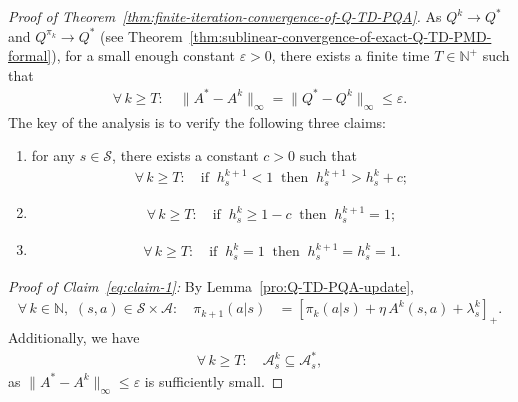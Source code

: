 \documentclass[10pt]{article}
\newcommand{\calA}{\mathcal{A}}
\newcommand{\calS}{\mathcal{S}}
\newcommand{\ls}{\left}
\newcommand{\rs}{\right}
\theoremstyle{plain}
\theoremstyle{definition}
\begin{document}
    \begin{proof}[Proof of Theorem~\ref{thm:finite-iteration-convergence-of-Q-TD-PQA}]
    As $Q^k \to Q^*$ and $Q^{\pi_k} \to Q^*$ (see Theorem~\ref{thm:sublinear-convergence-of-exact-Q-TD-PMD-formal}), for a small enough constant $\varepsilon > 0$, there exists a finite time $T \in \mathbb{N}^+$ such that 
    \begin{align*}
        \forall\, k \geq T: \quad \| A^* - A^k \|_\infty = \| Q^* - Q^k \|_\infty \leq \varepsilon.
    \end{align*}
    The key of the analysis is to verify the following three claims:
    \begin{enumerate}[label=(\Roman*)]
        \item \label{eq:claim-1} for any $s\in\calS$, there exists a constant $c > 0$ such that
        \begin{align}
            \forall\, k\geq T: \quad \mbox{if} \;\; h_s^{k+1} < 1 \;\; \mbox{then} \;\; h_s^{k+1} > h_s^k + c;
            \label{eq:property-1}
        \end{align}
        \item \label{eq:claim-2} 
        \begin{align}
            \forall\, k \geq T: \quad  \mbox{if} \;\; h_s^k \geq 1 - c \;\; \mbox{then} \;\;  h_s^{k+1} = 1;
            \label{eq:property-2}
        \end{align}
        \item \label{eq:claim-3}
        \begin{align}
            \forall\, k\geq T: \quad \mbox{if} \;\; h_s^k = 1 \;\; \mbox{then} \;\; h_s^{k+1} = h_s^k = 1.
        \label{eq:property-3}
    \end{align}
    \end{enumerate}
    \textit{Proof of Claim~\ref{eq:claim-1}:} By Lemma~\ref{pro:Q-TD-PQA-update},
    \begin{align*}
        \forall\, k\in\mathbb{N}, \,\, (s,a) \in \calS\times\calA:\quad \pi_{k+1}(a|s)
        &= \ls[ \pi_k(a|s) + \eta \, A^k(s,a) + \lambda_s^k \rs]_+.
    \end{align*}
    Additionally, we have 
    \begin{align*}
        \forall\, k \geq T: \quad \calA^k_s \subseteq \calA^*_s, 
    \end{align*}
    as $\| A^* - A^k \|_\infty \leq \varepsilon$ is sufficiently small. 


\end{proof}
\end{document}
